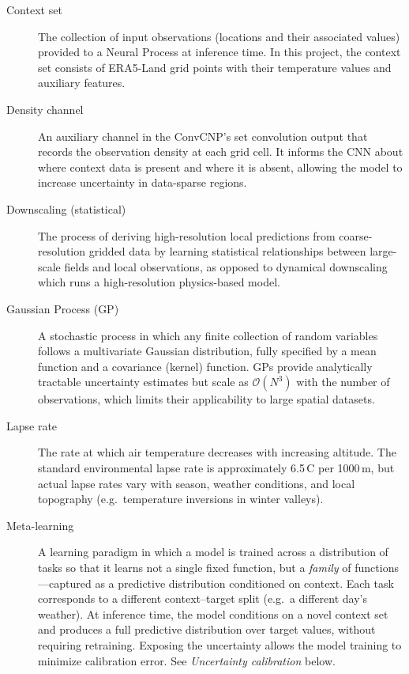 \begin{description}

    \item[Context set] The collection of input observations (locations and their associated values) provided to a Neural Process at inference time. In this project, the context set consists of ERA5-Land grid points with their temperature values and auxiliary features.

    \item[Density channel] An auxiliary channel in the ConvCNP's set convolution output that records the observation density at each grid cell. It informs the CNN about where context data is present and where it is absent, allowing the model to increase uncertainty in data-sparse regions.

    \item[Downscaling (statistical)] The process of deriving high-resolution local predictions from coarse-resolution gridded data by learning statistical relationships between large-scale fields and local observations, as opposed to dynamical downscaling which runs a high-resolution physics-based model.

    \item[Gaussian Process (GP)] A stochastic process in which any finite collection of random variables follows a multivariate Gaussian distribution, fully specified by a mean function and a covariance (kernel) function. GPs provide analytically tractable uncertainty estimates but scale as $\mathcal{O}(N^3)$ with the number of observations, which limits their applicability to large spatial datasets.

    \item[Lapse rate] The rate at which air temperature decreases with increasing altitude. The standard environmental lapse rate is approximately 6.5\,\textdegree C per 1000\,m, but actual lapse rates vary with season, weather conditions, and local topography (e.g.\ temperature inversions in winter valleys).

    \item[Meta-learning] A learning paradigm in which a model is trained across a distribution of tasks so that it learns not a single fixed function, but a \textit{family} of functions---captured as a predictive distribution conditioned on context. Each task corresponds to a different context--target split (e.g.\ a different day's weather). At inference time, the model conditions on a novel context set and produces a full predictive distribution over target values, without requiring retraining. Exposing the uncertainty allows the model training to minimize calibration error. See \textit{Uncertainty calibration} below.


\end{description}
